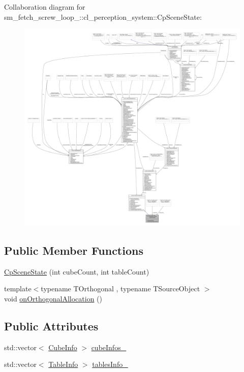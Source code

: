 Collaboration diagram for sm\+\_\+fetch\+\_\+screw\+\_\+loop\+\_\+:\+:cl\+\_\+perception\+\_\+system\+:\+:Cp\+Scene\+State\+:
\nopagebreak
\begin{figure}[H]
\begin{center}
\leavevmode
\includegraphics[width=350pt]{classsm__fetch__screw__loop__1_1_1cl__perception__system_1_1CpSceneState__coll__graph}
\end{center}
\end{figure}
\subsection*{Public Member Functions}
\begin{DoxyCompactItemize}
\item 
\hyperlink{classsm__fetch__screw__loop__1_1_1cl__perception__system_1_1CpSceneState_a020934ddbebe139eb42fe2932e4c8dcc}{Cp\+Scene\+State} (int cube\+Count, int table\+Count)
\item 
{\footnotesize template$<$typename T\+Orthogonal , typename T\+Source\+Object $>$ }\\void \hyperlink{classsm__fetch__screw__loop__1_1_1cl__perception__system_1_1CpSceneState_a715ac7fce5de77fc2e63aae6681541c6}{on\+Orthogonal\+Allocation} ()
\end{DoxyCompactItemize}
\subsection*{Public Attributes}
\begin{DoxyCompactItemize}
\item 
std\+::vector$<$ \hyperlink{structsm__fetch__screw__loop__1_1_1cl__perception__system_1_1CubeInfo}{Cube\+Info} $>$ \hyperlink{classsm__fetch__screw__loop__1_1_1cl__perception__system_1_1CpSceneState_a518bc2132bcc8e88152549db120d7d29}{cube\+Infos\+\_\+}
\item 
std\+::vector$<$ \hyperlink{structsm__fetch__screw__loop__1_1_1cl__perception__system_1_1TableInfo}{Table\+Info} $>$ \hyperlink{classsm__fetch__screw__loop__1_1_1cl__perception__system_1_1CpSceneState_adc87f7a438a7030adfaa9e94f0e8f4e0}{tables\+Info\+\_\+}
\end{DoxyCompactItemize}
